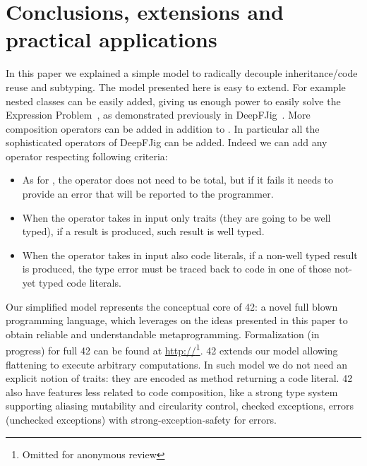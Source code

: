 \section{Conclusions, extensions and practical applications}

In this paper we explained a simple model to 
radically decouple inheritance/code reuse and subtyping.
The model presented here is easy to extend.
For example nested classes can be easily added, giving us enough power
to easily solve the Expression Problem~\cite{EP}, as demonstrated previously in
DeepFJig~\cite{deep}. More composition operators can be added in addition to \use.
In particular all the sophisticated operators of DeepFJig can be added.
 Indeed we can add any operator respecting following criteria:

\begin{itemize}
\item As for \use, the operator does not need to be total, but if it fails it needs to provide an error that will be reported to the programmer.
\item When the operator takes in input only traits (they are going to be well typed), if a result is produced,
 such result is well typed.
\item When the operator takes in input also code literals, if a non-well typed result is produced,
the type error must be traced back to code in one of those not-yet typed code literals.
 \end{itemize}
 

 
 Our simplified model represents the conceptual core of  42: a novel full blown programming language,
which leverages on the ideas presented in this paper to obtain reliable and understandable metaprogramming.
Formalization (in progress) for full 42 can be found at
\url{http://}\footnote{Omitted for anonymous review}. 
42 extends our model allowing
flattening to execute arbitrary computations.
In such model we do not need an explicit notion of traits: they are encoded as method returning a code literal.
42 also have features less related to code composition, like
  a strong type system supporting aliasing mutability and circularity control,
   checked exceptions, errors (unchecked exceptions) with strong-exception-safety for errors.

\begin{comment}
42 do not have a finite set of composition operators; they can be
added using the built in support for native method calls. They can
be dynamically checked to verify that they are well behaved
according to our predicate, or they can be trusted to achieve
efficiency.
\end{comment}


